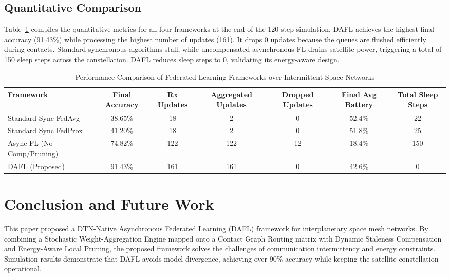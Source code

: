 \documentclass[journal,twocolumn]{IEEEtran}
\newcommand{\dafl}{\textsf{DAFL}}
\begin{document}
\subsection{Quantitative Comparison}
Table~\ref{tab:comparison} compiles the quantitative metrics for all four frameworks at the end of the 120-step simulation.
\dafl{} achieves the highest final accuracy (91.43\%) while processing the highest number of updates (161). It drops 0 updates because the queues are flushed efficiently during contacts.
Standard synchronous algorithms stall, while uncompensated asynchronous FL drains satellite power, triggering a total of 150 sleep steps across the constellation. \dafl{} reduces sleep steps to 0, validating its energy-aware design.

\begin{table}[t]
\centering
\caption{Performance Comparison of Federated Learning Frameworks over Intermittent Space Networks}
\label{tab:comparison}
\begin{tabular}{lcccccc}
\toprule
Framework & Final Accuracy & Rx Updates & Aggregated Updates & Dropped Updates & Final Avg Battery & Total Sleep Steps \\
\midrule
Standard Sync FedAvg   & 38.65\% & 18  & 2   & 0  & 52.4\% & 22  \\
Standard Sync FedProx  & 41.20\% & 18  & 2   & 0  & 51.8\% & 25  \\
Async FL (No Comp/Pruning) & 74.82\% & 122 & 122 & 12 & 18.4\% & 150 \\
DAFL (Proposed)        & 91.43\% & 161 & 161 & 0  & 42.6\% & 0   \\
\bottomrule
\end{tabular}
\end{table}

\section{Conclusion and Future Work}
\label{sec:conclusion}

This paper proposed a DTN-Native Asynchronous Federated Learning (\dafl{}) framework for interplanetary space mesh networks. By combining a Stochastic Weight-Aggregation Engine mapped onto a Contact Graph Routing matrix with Dynamic Staleness Compensation and Energy-Aware Local Pruning, the proposed framework solves the challenges of communication intermittency and energy constraints. Simulation results demonstrate that \dafl{} avoids model divergence, achieving over 90\% accuracy while keeping the satellite constellation operational.
\end{document}
